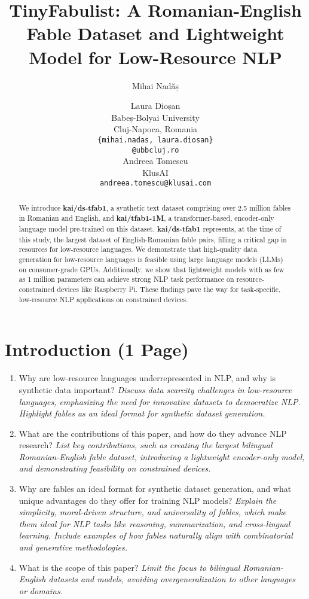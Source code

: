 \documentclass[11pt]{article}
\title{TinyFabulist: A Romanian-English Fable Dataset and Lightweight Model for Low-Resource NLP}
\author{Mihai Nadăș \and Laura Dioșan \\
  Babeș-Bolyai University \\
  Cluj-Napoca, Romania \\
  \texttt{\{mihai.nadas, laura.diosan\}} \\
  \texttt{@ubbcluj.ro} \\\And
  Andreea Tomescu \\
  KlusAI \\
  \texttt{andreea.tomescu@klusai.com} \\}
\begin{document}
\maketitle
\begin{abstract}
We introduce \textbf{kai/ds-tfab1}, a synthetic text dataset comprising over 2.5 million fables in Romanian and English, and \textbf{kai/tfab1-1M}, a transformer-based, encoder-only language model pre-trained on this dataset. \textbf{kai/ds-tfab1} represents, at the time of this study, the largest dataset of English-Romanian fable pairs, filling a critical gap in resources for low-resource languages. We demonstrate that high-quality data generation for low-resource languages is feasible using large language models (LLMs) on consumer-grade GPUs. Additionally, we show that lightweight models with as few as 1 million parameters can achieve strong NLP task performance on resource-constrained devices like Raspberry Pi. These findings pave the way for task-specific, low-resource NLP applications on constrained devices.
\end{abstract}

\section{Introduction (1 Page)}
\begin{enumerate}
    \item Why are low-resource languages underrepresented in NLP, and why is synthetic data important?  
    \textit{Discuss data scarcity challenges in low-resource languages, emphasizing the need for innovative datasets to democratize NLP. Highlight fables as an ideal format for synthetic dataset generation.}

    \item What are the contributions of this paper, and how do they advance NLP research?  
    \textit{List key contributions, such as creating the largest bilingual Romanian-English fable dataset, introducing a lightweight encoder-only model, and demonstrating feasibility on constrained devices.}

    \item Why are fables an ideal format for synthetic dataset generation, and what unique advantages do they offer for training NLP models?  
    \textit{Explain the simplicity, moral-driven structure, and universality of fables, which make them ideal for NLP tasks like reasoning, summarization, and cross-lingual learning. Include examples of how fables naturally align with combinatorial and generative methodologies. \citep{qian_understanding_2023}}

    \item What is the scope of this paper?  
    \textit{Limit the focus to bilingual Romanian-English datasets and models, avoiding overgeneralization to other languages or domains.}
\end{enumerate}
\end{document}
